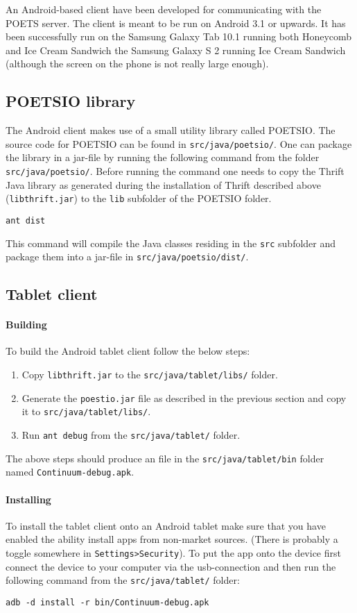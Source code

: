 \documentclass[10pt,final]{article}
\begin{document}
An Android-based client have been developed for communicating with the
POETS server. The client is meant to be run on Android 3.1 or
upwards. It has been successfully run on the Samsung Galaxy Tab 10.1
running both Honeycomb and Ice Cream Sandwich the Samsung Galaxy S 2
running Ice Cream Sandwich (although the screen on the phone is not
really large enough).

\subsection{POETSIO library}

The Android client makes use of a small utility library called
POETSIO. The source code for POETSIO can be found in
\verb-src/java/poetsio/-. One can package the library in a jar-file by
running the following command from the folder
\verb-src/java/poetsio/-. Before running the command one needs to copy
the Thrift Java library as generated during the installation of Thrift
described above (\verb-libthrift.jar-) to the \verb-lib- subfolder of
the POETSIO folder.
\begin{verbatim}
ant dist
\end{verbatim}
This command will compile the Java classes residing in the \verb-src-
subfolder and package them into a jar-file in
\verb-src/java/poetsio/dist/-.


\subsection{Tablet client}

\paragraph{Building}
To build the Android tablet client follow the below steps:
\begin{enumerate}
\item Copy \verb-libthrift.jar- to the \verb-src/java/tablet/libs/-
  folder.
\item Generate the \verb-poestio.jar- file as described in the
  previous section and copy it to \verb-src/java/tablet/libs/-.
\item Run \verb-ant debug- from the \verb-src/java/tablet/- folder.
\end{enumerate}
The above steps should produce an file in the
\verb-src/java/tablet/bin- folder named \verb|Continuum-debug.apk|.

\paragraph{Installing} To install the tablet client onto an Android
tablet make sure that you have enabled the ability install apps from
non-market sources. (There is probably a toggle somewhere in
\verb-Settings>Security-). To put the app onto the device first
connect the device to your computer via the usb-connection and then
run the following command from the \verb-src/java/tablet/- folder:
\begin{verbatim}
adb -d install -r bin/Continuum-debug.apk
\end{verbatim}
\end{document}
